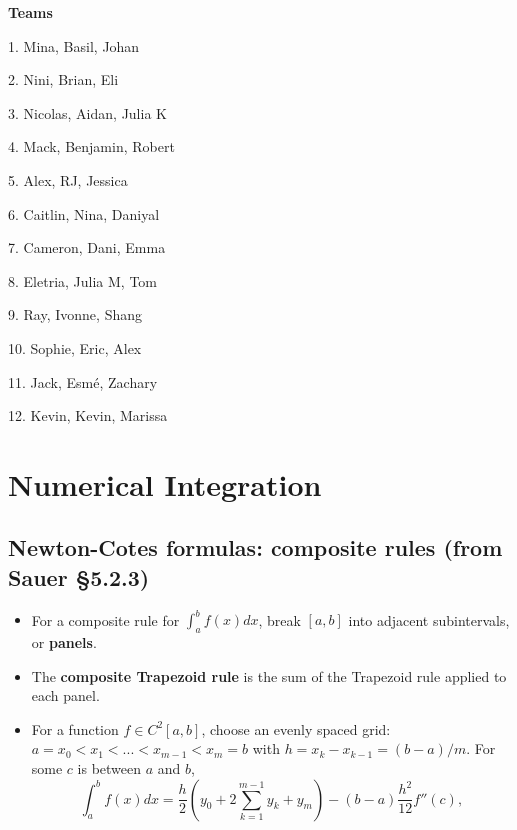 \documentclass[12pt,letterpaper,noanswers]{exam}
\begin{document}
\noindent \textbf{Teams}
\begin{multicols}{3}
1. Mina, Basil, Johan

2. Nini, Brian, Eli

3. Nicolas, Aidan, Julia K

4. Mack, Benjamin, Robert

5. Alex, RJ, Jessica

6. Caitlin, Nina, Daniyal

7. Cameron, Dani, Emma

8. Eletria, Julia M, Tom

9. Ray, Ivonne, Shang

10.  Sophie, Eric, Alex

11. Jack, Esmé, Zachary

12. Kevin, Kevin, Marissa

\end{multicols}


\section*{Numerical Integration}
\subsection*{Newton-Cotes formulas: composite rules (from Sauer \S 5.2.3)}
\begin{tcolorbox}

\begin{itemize}
\itemsep0pt
    \item For a composite rule for $\displaystyle\int_a^b f(x)dx$, break $[a,b]$ into adjacent subintervals, or \textbf{panels}.
    \item The \textbf{composite Trapezoid rule} is the sum of the Trapezoid rule applied to each panel.
    \item For a function $f\in C^2[a,b]$, choose an evenly spaced grid: $a = x_0<x_1<...<x_{m-1}<x_m = b$ with $h = x_k-x_{k-1} = (b-a)/m$.  For some  $c$ is between $a$ and $b$, \[\displaystyle\int_a^b f(x)dx = \frac{h}{2}\left(y_0 + 2\sum\limits_{k=1}^{m-1}y_k + y_m \right) - (b-a)\frac{h^2}{12}f''(c),\] 
\end{itemize}
\end{tcolorbox}
\end{document}
